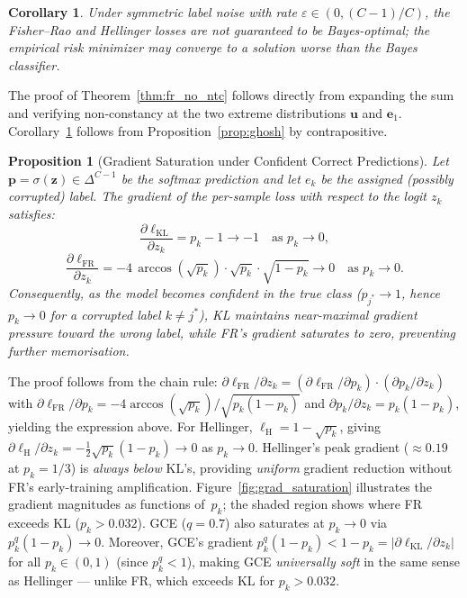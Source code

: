 \documentclass[11pt]{article}
\newtheorem{proposition}{Proposition}
\newtheorem{corollary}{Corollary}
\begin{document}
\begin{corollary}
\label{cor:fr_not_robust}
Under symmetric label noise with rate $\varepsilon \in (0,(C-1)/C)$, the
Fisher--Rao and Hellinger losses are \emph{not} guaranteed to be Bayes-optimal;
the empirical risk minimizer may converge to a solution worse than the Bayes
classifier.
\end{corollary}

The proof of Theorem~\ref{thm:fr_no_ntc} follows directly from expanding the
sum and verifying non-constancy at the two extreme distributions $\mathbf{u}$
and $\mathbf{e}_1$.
Corollary~\ref{cor:fr_not_robust} follows from Proposition~\ref{prop:ghosh}
by contrapositive.

\begin{proposition}[Gradient Saturation under Confident Correct Predictions]
\label{prop:grad_saturation}
Let $\mathbf{p} = \sigma(\mathbf{z}) \in \Delta^{C-1}$ be the softmax prediction
and let $e_k$ be the assigned (possibly corrupted) label.
The gradient of the per-sample loss with respect to the logit $z_k$ satisfies:
\[
  \frac{\partial \ell_\mathrm{KL}}{\partial z_k} = p_k - 1 \longrightarrow -1
  \quad \text{as } p_k \to 0,
\]
\[
  \frac{\partial \ell_\mathrm{FR}}{\partial z_k}
    = -4\,\arccos(\sqrt{p_k})\cdot\sqrt{p_k}\cdot\sqrt{1-p_k}
    \longrightarrow 0
  \quad \text{as } p_k \to 0.
\]
Consequently, as the model becomes confident in the \emph{true} class
($p_{j^*} \to 1$, hence $p_k \to 0$ for a corrupted label $k \neq j^*$),
KL maintains near-maximal gradient pressure toward the wrong label,
while FR's gradient saturates to zero, preventing further memorisation.
\end{proposition}

The proof follows from the chain rule:
$\partial\ell_\mathrm{FR}/\partial z_k = (\partial\ell_\mathrm{FR}/\partial p_k)\cdot(\partial p_k/\partial z_k)$
with $\partial\ell_\mathrm{FR}/\partial p_k = -4\arccos(\!\sqrt{p_k}\!)/\!\sqrt{p_k(1-p_k)}$
and $\partial p_k/\partial z_k = p_k(1-p_k)$, yielding the expression above.
For Hellinger, $\ell_\mathrm{H} = 1 - \sqrt{p_k}$, giving
$\partial\ell_\mathrm{H}/\partial z_k = -\tfrac{1}{2}\sqrt{p_k}(1-p_k) \to 0$ as $p_k\to 0$.
Hellinger's peak gradient ($\approx 0.19$ at $p_k=1/3$) is \emph{always below} KL's,
providing \emph{uniform} gradient reduction without FR's early-training amplification.
Figure~\ref{fig:grad_saturation} illustrates the gradient magnitudes as functions of~$p_k$; the shaded region
shows where FR exceeds KL ($p_k > 0.032$).
GCE ($q=0.7$) also saturates at $p_k\to 0$ via $p_k^q(1-p_k)\to 0$.
Moreover, GCE's gradient $p_k^q(1-p_k) < 1-p_k = |\partial\ell_\mathrm{KL}/\partial z_k|$
for all $p_k\in(0,1)$ (since $p_k^q < 1$), making GCE \emph{universally soft} in the
same sense as Hellinger — unlike FR, which exceeds KL for $p_k>0.032$.
\end{document}
